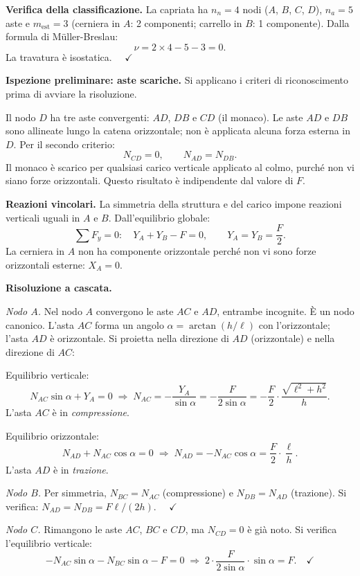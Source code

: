 \begin{esempio}
\begin{svolgimento}
		\noindent\textbf{Verifica della classificazione.}
		La capriata ha $n_n = 4$ nodi ($A$, $B$, $C$, $D$),
		$n_a = 5$ aste e $m_\text{est} = 3$ (cerniera in $A$:
		2 componenti; carrello in $B$: 1 componente). Dalla
		formula di M\"{u}ller-Breslau:
		\[
		\nu = 2 \times 4 - 5 - 3 = 0.
		\]
		La travatura è isostatica. $\quad\checkmark$
		
		\noindent\textbf{Ispezione preliminare: aste scariche.}
		Si applicano i criteri di riconoscimento prima di
		avviare la risoluzione.
		
		Il nodo $D$ ha tre aste convergenti: $AD$, $DB$
		e $CD$ (il monaco). Le aste $AD$ e $DB$ sono
		allineate lungo la catena orizzontale; non è
		applicata alcuna forza esterna in $D$. Per il
		secondo criterio:
		\[
		N_{CD} = 0, \qquad N_{AD} = N_{DB}.
		\]
		Il monaco è scarico per qualsiasi carico verticale
		applicato al colmo, purché non vi siano forze
		orizzontali. Questo risultato è indipendente dal
		valore di $F$.
		
		\noindent\textbf{Reazioni vincolari.}
		La simmetria della struttura e del carico impone
		reazioni verticali uguali in $A$ e $B$. Dall'equilibrio
		globale:
		\[
		\sum F_y = 0:\quad
		Y_A + Y_B - F = 0,
		\qquad
		Y_A = Y_B = \frac{F}{2}.
		\]
		La cerniera in $A$ non ha componente orizzontale
		perché non vi sono forze orizzontali esterne:
		$X_A = 0$.
		
		\noindent\textbf{Risoluzione a cascata.}
		
		\textit{Nodo $A$.}
		Nel nodo $A$ convergono le aste $AC$ e $AD$,
		entrambe incognite. È un nodo canonico.
		L'asta $AC$ forma un angolo $\alpha = \arctan(h/\ell)$
		con l'orizzontale; l'asta $AD$ è orizzontale.
		Si proietta nella direzione di $AD$ (orizzontale)
		e nella direzione di $AC$:
		
		Equilibrio verticale:
		\[
		N_{AC}\sin\alpha + Y_A = 0
		\;\Rightarrow\;
		N_{AC} = -\frac{Y_A}{\sin\alpha}
		= -\frac{F}{2\sin\alpha}
		= -\frac{F}{2} \cdot \frac{\sqrt{\ell^2+h^2}}{h}.
		\]
		L'asta $AC$ è in \emph{compressione}.
		
		Equilibrio orizzontale:
		\[
		N_{AD} + N_{AC}\cos\alpha = 0
		\;\Rightarrow\;
		N_{AD} = -N_{AC}\cos\alpha
		= \frac{F}{2} \cdot \frac{\ell}{h}.
		\]
		L'asta $AD$ è in \emph{trazione}.
		
		\textit{Nodo $B$.}
		Per simmetria, $N_{BC} = N_{AC}$ (compressione)
		e $N_{DB} = N_{AD}$ (trazione). Si verifica:
		$N_{AD} = N_{DB} = F\ell/(2h)$. $\quad\checkmark$
		
		\textit{Nodo $C$.}
		Rimangono le aste $AC$, $BC$ e $CD$, ma $N_{CD} = 0$
		è già noto. Si verifica l'equilibrio verticale:
		\[
		-N_{AC}\sin\alpha - N_{BC}\sin\alpha - F = 0
		\;\Rightarrow\;
		2 \cdot \frac{F}{2\sin\alpha} \cdot \sin\alpha
		= F. \quad\checkmark
		\]
		

\end{svolgimento}
\end{esempio}
